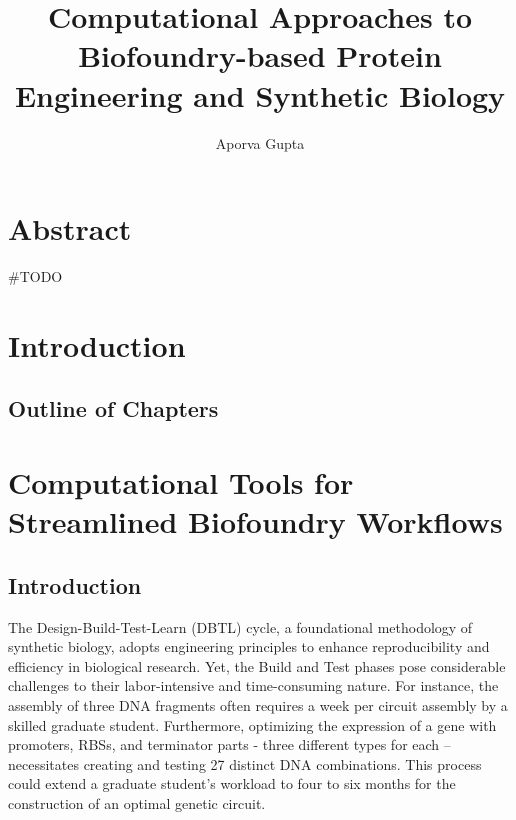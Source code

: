 \documentclass[
  letterpaper,
]{book}
\title{Computational Approaches to Biofoundry-based Protein Engineering
and Synthetic Biology}
\author{Aporva Gupta}
\date{}
\renewcommand*\contentsname{Table of contents}
\newcommand\contentsname{Table of contents}
\begin{document}
\frontmatter
\maketitle

\renewcommand*\contentsname{Table of contents}
{
\setcounter{tocdepth}{2}
\tableofcontents
}
\mainmatter
{}

\chapter*{Abstract}\label{abstract}


\#TODO


\chapter*{Introduction}\label{introduction}


\section*{Outline of Chapters}\label{outline-of-chapters}



\chapter{Computational Tools for Streamlined Biofoundry
Workflows}\label{computational-tools-for-streamlined-biofoundry-workflows}

\section{Introduction}\label{introduction-1}

The Design-Build-Test-Learn (DBTL) cycle, a foundational methodology of
synthetic biology, adopts engineering principles to enhance
reproducibility and efficiency in biological research. Yet, the Build
and Test phases pose considerable challenges to their labor-intensive
and time-consuming nature. For instance, the assembly of three DNA
fragments often requires a week per circuit assembly by a skilled
graduate student. Furthermore, optimizing the expression of a gene with
promoters, RBSs, and terminator parts - three different types for each
-- necessitates creating and testing 27 distinct DNA combinations. This
process could extend a graduate student's workload to four to six months
for the construction of an optimal genetic circuit.
\end{document}
